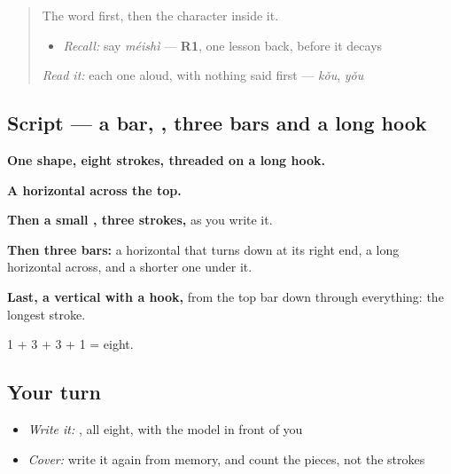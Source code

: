 \label{lesson:ZH-W167-shi-matter}



\begin{quote}
The word first, then the character inside it.

\begin{itemize}
\raggedright
  \item \emph{Recall:} say \emph{méishì} — \textbf{R1}, one lesson back, before it decays
\end{itemize}

\begin{quote}
 
\end{quote}

\emph{Read it:} each one aloud, with nothing said first — \emph{kǒu}, \emph{yǒu}
\end{quote}

\subsection*{Script — a bar, , three bars and a long hook}

\begin{quote}
\end{quote}

\textbf{One shape, eight strokes, threaded on a long hook.}

\textbf{A horizontal across the top.}

\textbf{Then a small , three strokes,} as you write it.

\textbf{Then three bars:} a horizontal that turns down at its right end, a long horizontal across, and a shorter one under it.

\textbf{Last, a vertical with a hook,} from the top bar down through everything: the longest stroke.

1 + 3 + 3 + 1 = eight.

\subsection*{Your turn}
\begin{itemize}
\raggedright
  \item \emph{Write it:} , all eight, with the model in front of you
  \item \emph{Cover:} write it again from memory, and count the pieces, not the strokes
\end{itemize}

